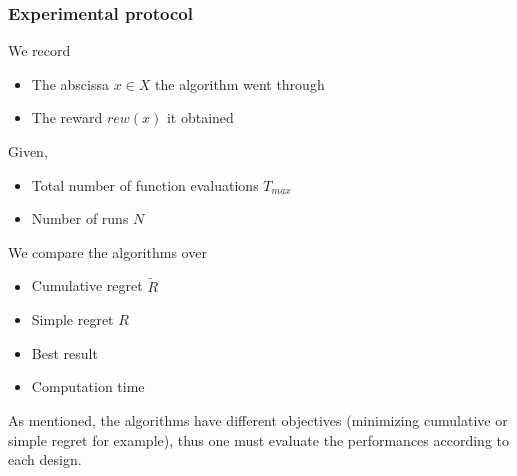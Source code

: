 \documentclass[xcolor={usenames,dvipsnames}]{beamer}
\begin{document}
\begin{frame}
\frametitle{Experimental protocol}
We record
\begin{itemize}
	\item The abscissa $x \in X$ the algorithm went through
	\item The reward $rew(x)$ it obtained
\end{itemize}
Given,
\begin{itemize}
	\item Total number of function evaluations $T_{max}$
	\item Number of runs $N$
\end{itemize}
We compare the algorithms over
\begin{itemize}
	\item Cumulative regret $\tilde{R}$
	\item Simple regret $R$
	\item Best result
	\item Computation time
\end{itemize}
As mentioned, the algorithms have different objectives (minimizing cumulative or simple regret for example), thus one must evaluate the performances according to each design.

\end{frame}
\end{document}
